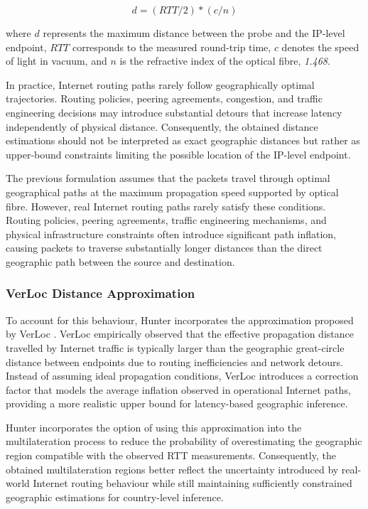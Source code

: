 \begin{equation*}
    d = (RTT/2) * (c/n)   
\end{equation*}

where $d$ represents the maximum distance between the probe and the IP-level endpoint, $RTT$ corresponds to the measured round-trip time, $c$ denotes the speed of light in vacuum, and $n$ is the refractive index of the optical fibre, \textit{1.468}.

In practice, Internet routing paths rarely follow geographically optimal trajectories. Routing policies, peering agreements, congestion, and traffic engineering decisions may introduce substantial detours that increase latency independently of physical distance. Consequently, the obtained distance estimations should not be interpreted as exact geographic distances but rather as upper-bound constraints limiting the possible location of the IP-level endpoint.

The previous formulation assumes that the packets travel through optimal geographical paths at the maximum propagation speed supported by optical fibre. However, real Internet routing paths rarely satisfy these conditions. Routing policies, peering agreements, traffic engineering mechanisms, and physical infrastructure constraints often introduce significant path inflation, causing packets to traverse substantially longer distances than the direct geographic path between the source and destination.

\subsubsection{VerLoc Distance Approximation}
\label{sc:hunter_multilateration_distance_estimation_verloc}

To account for this behaviour, Hunter incorporates the approximation proposed by VerLoc \cite{Kohls2022VerLoc:Systems}. VerLoc empirically observed that the effective propagation distance travelled by Internet traffic is typically larger than the geographic great-circle distance between endpoints due to routing inefficiencies and network detours. Instead of assuming ideal propagation conditions, VerLoc introduces a correction factor that models the average inflation observed in operational Internet paths, providing a more realistic upper bound for latency-based geographic inference.

Hunter incorporates the option of using this approximation into the multilateration process to reduce the probability of overestimating the geographic region compatible with the observed RTT measurements. Consequently, the obtained multilateration regions better reflect the uncertainty introduced by real-world Internet routing behaviour while still maintaining sufficiently constrained geographic estimations for country-level inference.


